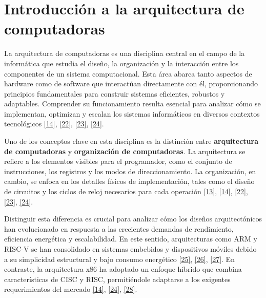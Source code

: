 \documentclass[12pt,oneside]{templates/unerthesis}
\begin{document}
\hypertarget{introducciuxf3n-a-la-arquitectura-de-computadoras}{%
\section{Introducción a la arquitectura de computadoras}\label{introducciuxf3n-a-la-arquitectura-de-computadoras}}

La arquitectura de computadoras es una disciplina central en el campo de la informática que estudia el diseño, la organización y la interacción entre los componentes de un sistema computacional. Esta área abarca tanto aspectos de hardware como de software que interactúan directamente con él, proporcionando principios fundamentales para construir sistemas eficientes, robustos y adaptables. Comprender su funcionamiento resulta esencial para analizar cómo se implementan, optimizan y escalan los sistemas informáticos en diversos contextos tecnológicos \protect\hyperlink{ref-stallings_computer_2021}{{[}14{]}}, \protect\hyperlink{ref-tanenbaum_structured_2016}{{[}22{]}}, \protect\hyperlink{ref-murdocca_principles_2000}{{[}23{]}}, \protect\hyperlink{ref-bryant2015computer}{{[}24{]}}.

Uno de los conceptos clave en esta disciplina es la distinción entre \textbf{arquitectura de computadoras} y \textbf{organización de computadoras}. La arquitectura se refiere a los elementos visibles para el programador, como el conjunto de instrucciones, los registros y los modos de direccionamiento. La organización, en cambio, se enfoca en los detalles físicos de implementación, tales como el diseño de circuitos y los ciclos de reloj necesarios para cada operación \protect\hyperlink{ref-hennessy2017computer}{{[}13{]}}, \protect\hyperlink{ref-stallings_computer_2021}{{[}14{]}}, \protect\hyperlink{ref-tanenbaum_structured_2016}{{[}22{]}}, \protect\hyperlink{ref-murdocca_principles_2000}{{[}23{]}}, \protect\hyperlink{ref-bryant2015computer}{{[}24{]}}.

Distinguir esta diferencia es crucial para analizar cómo los diseños arquitectónicos han evolucionado en respuesta a las crecientes demandas de rendimiento, eficiencia energética y escalabilidad. En este sentido, arquitecturas como ARM y RISC-V se han consolidado en sistemas embebidos y dispositivos móviles debido a su simplicidad estructural y bajo consumo energético \protect\hyperlink{ref-waterman_risc-v_2014}{{[}25{]}}, \protect\hyperlink{ref-harris2015digital}{{[}26{]}}, \protect\hyperlink{ref-null_essentials_2014}{{[}27{]}}. En contraste, la arquitectura x86 ha adoptado un enfoque híbrido que combina características de CISC y RISC, permitiéndole adaptarse a los exigentes requerimientos del mercado \protect\hyperlink{ref-stallings_computer_2021}{{[}14{]}}, \protect\hyperlink{ref-bryant2015computer}{{[}24{]}}, \protect\hyperlink{ref-patterson_computer_2014}{{[}28{]}}.
\end{document}
